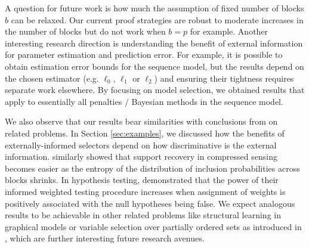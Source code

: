 \documentclass[aos]{imsart}
\theoremstyle{plain}
\newcommand{\david}[1]{{\small{\color{blue} \sf $\heartsuit$ David: #1}}}
\newcommand{\paul}[1]{{\small{\color{green} \sf $\spadesuit$ Paul: #1}}}
\begin{document}
A question %
for future work is how much the assumption of fixed number of blocks $b$ can be relaxed. Our current proof strategies %
are robust to moderate increases in the number of blocks but do not work when $b=p$ for example. Another interesting research direction is understanding the benefit of external information for parameter estimation and prediction error.
For example, it is possible to obtain estimation error bounds for the sequence model, but the results depend on the chosen estimator (e.g. $\ell_0$, $\ell_1$ or $\ell_2$) and ensuring their tightness requires separate work elsewhere. By focusing on model selection, we obtained results that apply to essentially all penalties / Bayesian methods in the sequence model.

We also observe that our results bear similarities with conclusions from on related problems. In Section \ref{sec:examples}, we discussed how the benefits of externally-informed selectors depend on how discriminative is the external information. \cite{scarlett2012compressed} similarly showed that support recovery in compressed sensing becomes easier as the entropy of the distribution of inclusion probabilities across blocks shrinks. In hypothesis testing, \cite{genovese2006} demonstrated that the power of their informed weighted testing procedure increases when assignment of weights is positively associated with the null hypotheses being false. We expect analogous results to be achievable in other related problems like structural learning in graphical models or variable selection over partially ordered sets as introduced in \cite{taeb}, which are further interesting future research avenues. 
\end{document}
